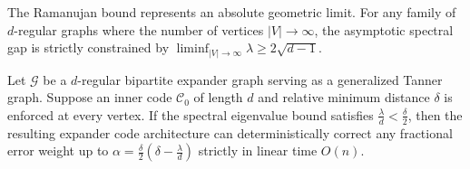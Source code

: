\begin{theorem}
The Ramanujan bound represents an absolute geometric limit. For any family of $d$-regular graphs where the number of vertices $|V| \to \infty$, the asymptotic spectral gap is strictly constrained by $\liminf_{|V| \to \infty} \lambda \ge 2\sqrt{d-1}$.
\end{theorem}

\begin{theorem}
\label{thm:sipser_spielman}
Let $\mathcal{G}$ be a $d$-regular bipartite expander graph serving as a generalized Tanner graph. Suppose an inner code $\mathcal{C}_0$ of length $d$ and relative minimum distance $\delta$ is enforced at every vertex. If the spectral eigenvalue bound satisfies $\frac{\lambda}{d} < \frac{\delta}{2}$, then the resulting expander code architecture can deterministically correct any fractional error weight up to $\alpha = \frac{\delta}{2} \left( \delta - \frac{\lambda}{d} \right)$ strictly in linear time $O(n)$.
\end{theorem}


